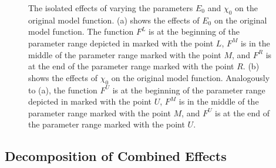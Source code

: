 \begin{figure}
	\centering
	\caption[The effects of single parameters on the original model function]{
		The isolated effects of varying the parameters $E_0$ and $\chi_0$ on the original model function.
		(a) shows the effects of $E_0$ on the original model function.
		The function $F^L$ is at the beginning of the parameter range depicted in  marked with the point $L$, $F^M$ is in the middle of the parameter range marked with the point $M$, and $F^R$ is at the end of the parameter range marked with the point $R$.
		(b) shows the effects of $\chi_0$ on the original model function.
		Analogously to (a), the function $F^U$ is at the beginning of the parameter range depicted in  marked with the point $U$, $F^M$ is in the middle of the parameter range marked with the point $M$, and $F^U$ is at the end of the parameter range marked with the point $U$.
	}
	\label{fig:setup.char.evolution.single}
\end{figure}

\subsection{Decomposition of Combined Effects}
\label{sec:yunus.param.effects.decomposition}

